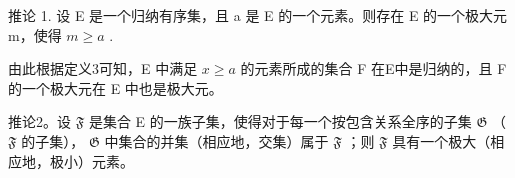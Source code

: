 推论 1. 设 E 是一个归纳有序集，且 a 是 E 的一个元素。则存在 E 的一个极大元 m，使得 \(m \geqslant a\) .

由此根据定义3可知，E 中满足 \(x \geqslant a\) 的元素所成的集合 F 在E中是归纳的，且 F 的一个极大元在 E 中也是极大元。

推论2。设 \(\mathfrak{F}\) 是集合 E 的一族子集，使得对于每一个按包含关系全序的子集 \(\mathfrak{G}\) （ \(\mathfrak{F}\) 的子集）， \(\mathfrak{G}\) 中集合的并集（相应地，交集）属于 \(\mathfrak{F}\) ；则 \(\mathfrak{F}\) 具有一个极大（相应地，极小）元素。

